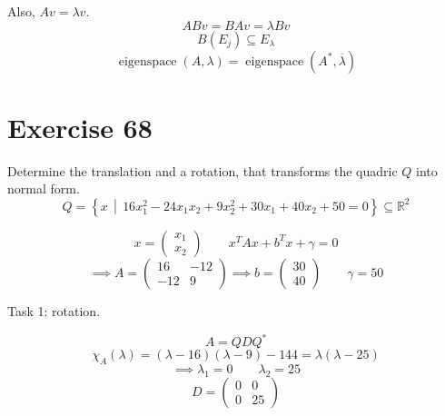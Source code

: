 \documentclass[a4paper]{article}
\theoremstyle{definition}
\newcommand\setdef[2]{\left\{#1\,\middle|\,#2\right\}}
\begin{document}
Also, $Av = \lambda v$.
\[ ABv = BAv = \lambda Bv \]
\[ B(E_j) \subseteq E_\lambda \]
\[ \operatorname{eigenspace}(A, \lambda) = \operatorname{eigenspace}(A^*, \overline\lambda) \]

\section*{Exercise 68}
\begin{ex}
  Determine the translation and a rotation, that transforms the quadric $Q$ into normal form.
  \[ Q = \setdef{x}{16 x_1^2 - 24 x_1 x_2 + 9 x_2^2 + 30x_1 + 40x_2 + 50 = 0} \subseteq \mathbb R^2 \]
\end{ex}

\[ x = \begin{pmatrix} x_1 \\ x_2 \end{pmatrix} \qquad x^T Ax + b^T x + \gamma = 0 \]
\[ \implies A = \begin{pmatrix} 16 & -12 \\ -12 & 9 \end{pmatrix} \implies b = \begin{pmatrix} 30 \\ 40 \end{pmatrix} \qquad \gamma = 50 \]

Task 1: rotation.

\[ A = QDQ^* \]
\[ \chi_A(\lambda) = (\lambda - 16)(\lambda - 9) - 144 = \lambda (\lambda - 25) \]
\[ \implies \lambda_1 = 0 \qquad \lambda_2 = 25 \]
\[ D = \begin{pmatrix} 0 & 0 \\ 0 & 25 \end{pmatrix} \]
\end{document}
